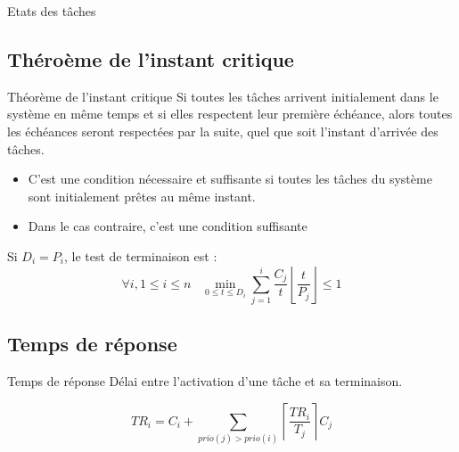 \begin{frame}{Etats des tâches}
  \begin{center}
  \end{center}
\end{frame} 

\subsection{Théroème de l'instant critique}

\begin{frame}{Théorème de l'instant critique}
  Si toutes les  tâches arrivent initialement dans le  système en même
  temps et  si elles respectent  leur première échéance,  alors toutes
  les  échéances  seront  respectées  par  la  suite,  quel  que  soit
  l'instant d'arrivée des tâches.

  \begin{itemize}
  \item  C'est une condition  nécessaire et  suffisante si  toutes les
    tâches du système sont initialement prêtes au même instant.
  \item Dans le cas contraire, c'est une condition suffisante
  \end{itemize}

  Si $D_i = P_i$, le test de terminaison est :
  $$\forall i, 1 \leq i \leq n \;\;\;\min_{0 \leq t \leq D_i}
  \sum_{j=1}^i\frac{C_j}{t}
  \left\lfloor\frac{t}{P_j}\right\rfloor \leq 1$$
\end{frame}

\subsection{Temps de réponse}

\begin{frame}{Temps de réponse}
  Délai entre l'activation d'une tâche et sa terminaison. 

  $$TR_i = C_i + \sum_{prio(j) > prio(i)} \left\lceil\frac{TR_i}{T_j}\right\rceil C_j$$

\end{frame}

